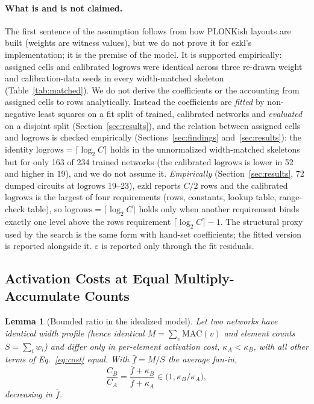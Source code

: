 \documentclass[10pt]{article}
\newtheorem{lemma}[theorem]{Lemma}
\newcommand{\logrows}{\mathrm{logrows}}
\begin{document}
\paragraph{What is and is not claimed.}
The first sentence of the assumption follows from how PLONKish layouts are built (weights are
witness values), but we do not prove it for ezkl's implementation; it is the premise of the model.  It is supported empirically: assigned cells and calibrated $\logrows$
were identical across three re-drawn weight and calibration-data seeds in every width-matched skeleton (Table~\ref{tab:matched}).
We do not derive the coefficients or the accounting from assigned cells to rows analytically.
Instead the coefficients are \emph{fitted} by non-negative least squares on a fit split of
trained, calibrated networks and \emph{evaluated} on a disjoint split (Section~\ref{sec:results}),
and the relation between assigned cells and $\logrows$ is checked empirically (Sections~\ref{sec:findings} and~\ref{sec:results}): the identity $\logrows=\lceil\log_2 C\rceil$ holds in the
unnormalized width-matched skeletons but for only 163 of 234 trained networks (the calibrated $\logrows$ is lower in 52 and higher in 19),
and we do not assume it.  \emph{Empirically} (Section~\ref{sec:results}, 72 dumped circuits at $\logrows$ 19--23), ezkl reports $C/2$ rows and the calibrated $\logrows$ is the largest of four requirements
(rows, constants, lookup table, range-check table), so $\logrows=\lceil\log_2 C\rceil$ holds only when another requirement binds exactly one level above the rows requirement $\lceil\log_2 C\rceil-1$.  The structural proxy
used by the search is the same form with hand-set coefficients; the fitted
version is reported alongside it.  $\varepsilon$ is reported only through the fit residuals.

\subsection{Activation Costs at Equal Multiply-Accumulate Counts}

\begin{lemma}[Bounded ratio in the idealized model]
\label{lem:ratio}
Let two networks have identical width profile (hence identical $M=\sum_v\mathrm{MAC}(v)$ and
element counts $S=\sum_i w_i$) and differ only in per-element activation cost, $\kappa_A<\kappa_B$,
with all other terms of Eq.~\eqref{eq:cost} equal.  With $\bar f=M/S$ the average fan-in,
\[
\frac{C_B}{C_A}=\frac{\bar f+\kappa_B}{\bar f+\kappa_A}\in\bigl(1,\kappa_B/\kappa_A\bigr),
\]
decreasing in $\bar f$.
\end{lemma}
\end{document}
